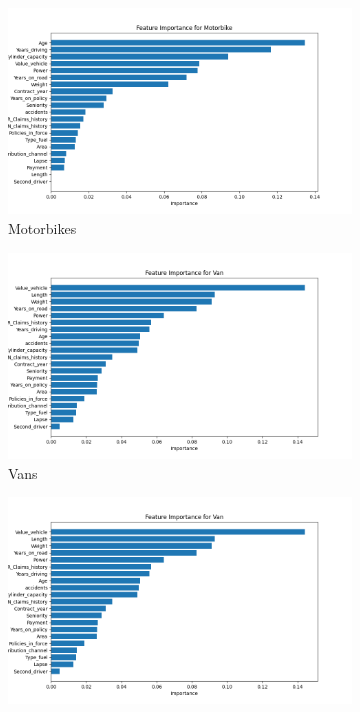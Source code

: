 \documentclass{llncs}
\begin{document}
\begin{figure}
    \centering
     \begin{subfigure}{0.45\linewidth}
      \includegraphics[width=\linewidth]{images/Motorbike_feature_importance_random_forest.png}
      \caption{Motorbikes}
      \label{fig:subrandom1}
     \end{subfigure}
     \begin{subfigure}{0.45\linewidth}
      \includegraphics[width=\linewidth]{images/Van_feature_importance_random_forest.png}
      \caption{Vans}
      \label{fig:subrandom2}
      \end{subfigure}
  \vfill
       \begin{subfigure}{0.45\linewidth}
       \includegraphics[width=\linewidth]{images/Van_feature_importance_random_forest.png}

\end{subfigure}
\end{figure}
\end{document}

